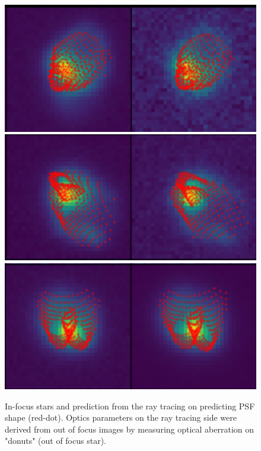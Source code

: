\begin{figure}
        \centering
        \includegraphics[scale=0.47]{figures/plot_psf_1}
        \includegraphics[scale=0.47]{figures/plot_psf_2}
        \includegraphics[scale=0.47]{figures/plot_psf_3}
        \caption{\small In-focus stars and prediction from the ray tracing on predicting PSF shape (red-dot). Optics parameters on the ray tracing side were derived from out of focus images by measuring optical aberration on "donuts" (out of focus star).}
        \label{fig:PSF_plot}
\end{figure}